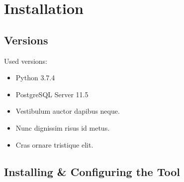 \chapter{Installation}
\section{Versions}
Used versions:
\begin{itemize}
	\item Python 3.7.4
	\item PostgreSQL Server 11.5
	\item Vestibulum auctor dapibus neque.
	\item Nunc dignissim risus id metus.
	\item Cras ornare tristique elit.
\end{itemize}

\section{Installing \& Configuring the Tool}